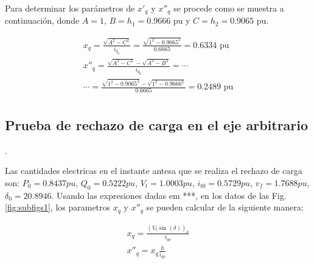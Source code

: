 \documentclass[conference]{IEEEtran}
\begin{document}
Para determinar los parámetros de $x'_q$ y $x''_q$ se procede como se muestra a continuación, donde
$A=1$, $B=h_1=0.9666\text{ pu}$ y $C=h_2=0.9065\text{ pu}$.

\begin{gather*}
x_q = \frac{\sqrt{A^2-C^2}}{i_{q_0}} = \frac{\sqrt{1^2 - 0.9065^2}}{0.6665} = 0.6334\text{ pu} \\
x''_q = \frac{\sqrt{A^2-C^2}-\sqrt{A^2-B^2}}{i_{q_0}}=\cdots\\
\cdots= \frac{\sqrt{1^2-0.9065^2}-\sqrt{1^2-0.9666^2}}{0.6665} = 0.2489\text{ pu}\\
\end{gather*}

\subsection{Prueba de rechazo de carga en el eje arbitrario}.

Las cantidades electricas en el instante antesa que se realiza el rechazo de carga son: $P_0 = 0.8437pu$, $Q_0 = 0.5222pu$, $V_t = 1.0003pu$, $i_{t0} = 0.5729pu$, $v_f = 1.7688pu$, $\delta_0 = 20.8946$.
Usando las expresiones dadas em ***, en los datos de las Fig.\ref{fig:subfigs1}, los parametros $x_q$ y $x''_q$ se pueden calcular de la siguiente manera:

\begin{gather}
    x_q = \frac{(V_t\sin(\delta))_0}{i_{qo}}\\
    x''_q = x_q\frac{h}{i_{qo}}
\end{gather}
\end{document}
